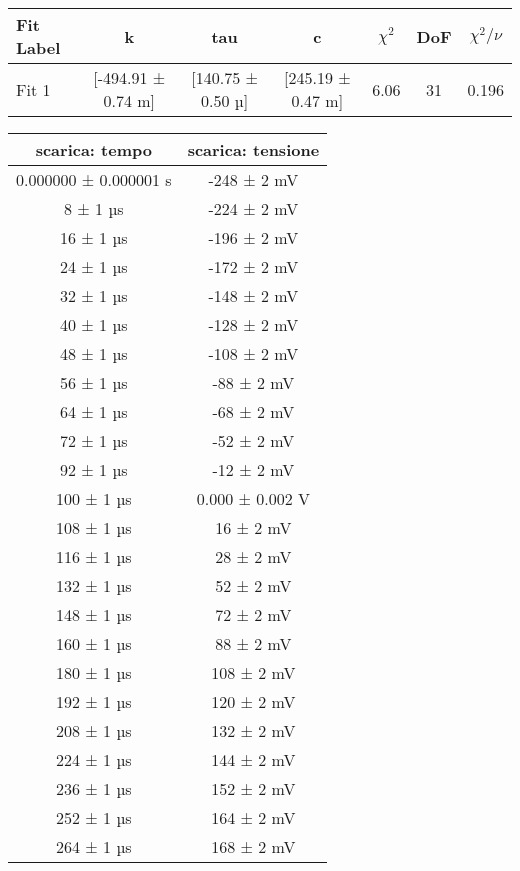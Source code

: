 \documentclass[a4paper]{article}
\begin{document}
\begin{table}[htbp]
    \centering
    \begin{tabular}{|l|cccccc|}
    \hline
    Fit Label & k & tau & c & $\chi^2$ & DoF & $\chi^2/\nu$ \\\hline\hline
    Fit 1 & [-494.91 ± 0.74 m] & [140.75 ± 0.50 µ] & [245.19 ± 0.47 m] & 6.06 & 31 & 0.196 \\\hline
    \end{tabular}
    \end{table}
    \begin{table}[htbp]
        \centering
        \begin{tabular}{|c|c|}
        \hline
        scarica: tempo & scarica: tensione \\\hline\hline
        0.000000 ± 0.000001 s & -248 ± 2 mV \\
        8 ± 1 µs & -224 ± 2 mV \\
        16 ± 1 µs & -196 ± 2 mV \\
        24 ± 1 µs & -172 ± 2 mV \\
        32 ± 1 µs & -148 ± 2 mV \\
        40 ± 1 µs & -128 ± 2 mV \\
        48 ± 1 µs & -108 ± 2 mV \\
        56 ± 1 µs & -88 ± 2 mV \\
        64 ± 1 µs & -68 ± 2 mV \\
        72 ± 1 µs & -52 ± 2 mV \\
        92 ± 1 µs & -12 ± 2 mV \\
        100 ± 1 µs & 0.000 ± 0.002 V \\
        108 ± 1 µs & 16 ± 2 mV \\
        116 ± 1 µs & 28 ± 2 mV \\
        132 ± 1 µs & 52 ± 2 mV \\
        148 ± 1 µs & 72 ± 2 mV \\
        160 ± 1 µs & 88 ± 2 mV \\
        180 ± 1 µs & 108 ± 2 mV \\
        192 ± 1 µs & 120 ± 2 mV \\
        208 ± 1 µs & 132 ± 2 mV \\
        224 ± 1 µs & 144 ± 2 mV \\
        236 ± 1 µs & 152 ± 2 mV \\
        252 ± 1 µs & 164 ± 2 mV \\
        264 ± 1 µs & 168 ± 2 mV \\

\end{tabular}
\end{table}
\end{document}
